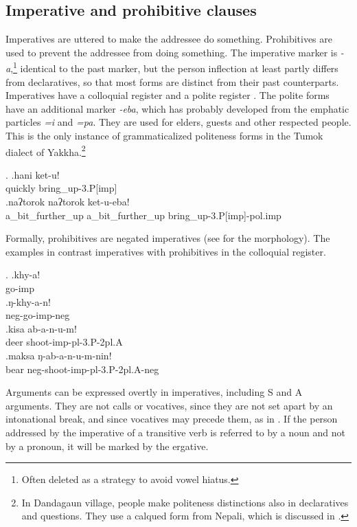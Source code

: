 \subsection{Imperative and prohibitive clauses}

Imperatives are uttered to make the addressee do something. Prohibitives are used to prevent the addressee from doing something. The imperative marker is \emph{-a},\footnote{Often deleted as a strategy to avoid vowel hiatus.} identical to the past marker, but the person inflection at least partly differs from declaratives, so that most forms are distinct from their past counterparts. Imperatives have a colloquial register \Next[a] and a polite register \Next[b]. The polite forms have an additional marker \emph{-eba}, which has probably developed from the emphatic particles \emph{=i} and \emph{=pa}. They are used for elders, guests and other respected people. This is the only instance of grammaticalized politeness forms in the Tumok dialect of Yakkha.\footnote{In Dandagaun village, people make politeness distinctions also in declaratives and questions. They use a calqued form from Nepali, which is discussed in .} 

\ex. \ag.hani ket-u!\\
quickly bring\_up{\sc -3.P[imp]}\\
\bg.naʔtorok naʔtorok ket-u-eba!\\
a\_bit\_further\_up a\_bit\_further\_up  bring\_up{\sc -3.P[imp]-pol.imp}\\

Formally, prohibitives are  negated imperatives (see  for the morphology). The examples in \Next contrast  imperatives with prohibitives in the colloquial register.

\ex. \ag.khy-a!\\
go{\sc -imp}\\
\bg.ŋ-khy-a-n!\\
{\sc neg-}go{\sc -imp-neg}\\
\bg.kisa ab-a-n-u-m!\\
deer shoot{\sc -imp-pl-3.P-2pl.A}\\
\bg.maksa ŋ-ab-a-n-u-m-nin!\\
bear {\sc neg-}shoot{\sc -imp-pl-3.P-2pl.A-neg}\\

Arguments can be expressed overtly in imperatives, including S and A arguments. They are not calls or vocatives, since they are not set apart by an intonational break, and since vocatives may precede them, as in \Next[a]. If the person addressed by the imperative of a transitive verb is referred to by a noun and not by a pronoun, it will be marked by the ergative.

